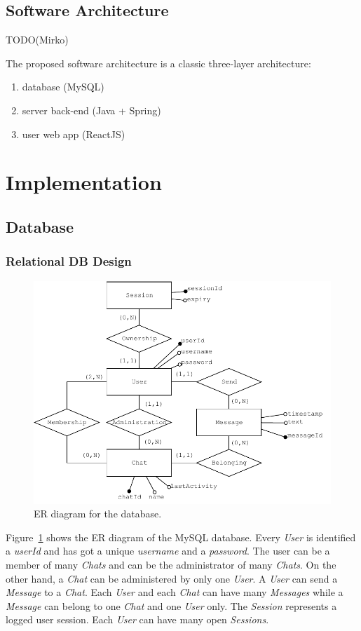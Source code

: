 \documentclass[10pt]{article}
\begin{document}
\subsection{Software Architecture}
TODO(Mirko)

The proposed software architecture is a classic three-layer architecture:
\begin{enumerate}
    \item database (MySQL)
    \item server back-end (Java + Spring)
    \item user web app (ReactJS)
\end{enumerate}

\clearpage
\section{Implementation}

\subsection{Database}
\subsubsection{Relational DB Design}
\begin{figure}[h!]
    \centering
    \includegraphics[width=\textwidth]{figs/ER}
    \caption{ER diagram for the database.}
    \label{fig:er}
\end{figure}

Figure~\ref{fig:er} shows the ER diagram of the MySQL database. Every \emph{User} 
is identified a \emph{userId} and has got a unique \emph{username} and a 
\emph{password}. The user can be a member of many \emph{Chats} and can 
be the administrator of many \emph{Chats}. On the other hand, a \emph{Chat} 
can be administered by only one \emph{User}. A \emph{User} can send a 
\emph{Message} to a \emph{Chat}. Each \emph{User} and each \emph{Chat} can 
have many \emph{Messages} while a \emph{Message} can belong to one \emph{Chat}
and one \emph{User} only. The \emph{Session} represents a logged user session.
Each \emph{User} can have many open \emph{Sessions}.
\end{document}
